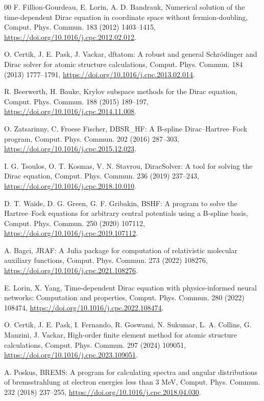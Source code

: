 \documentclass[a4paper,fleqn]{cas-dc}
\begin{document}
\begin{thebibliography}{00}
 F. Fillion-Gourdeau, E. Lorin, A. D. Bandrauk, Numerical solution of the time-dependent Dirac equation in coordinate space without fermion-doubling, Comput. Phys. Commun. 183 (2012) 1403--1415, \url{https://doi.org/10.1016/j.cpc.2012.02.012}.

 O. Certik, J. E. Pask, J. Vackar, dftatom: A robust and general Schr\"odinger and Dirac solver for atomic structure calculations, Comput. Phys. Commun. 184 (2013) 1777--1791, \url{https://doi.org/10.1016/j.cpc.2013.02.014}.

 R. Beerwerth, H. Bauke, Krylov subspace methods for the Dirac equation, Comput. Phys. Commun. 188 (2015) 189--197, \url{https://doi.org/10.1016/j.cpc.2014.11.008}.

 O. Zatsarinny, C. Froese Fischer, DBSR\_HF: A B-spline Dirac--Hartree--Fock program, Comput. Phys. Commun. 202 (2016) 287--303, \url{https://doi.org/10.1016/j.cpc.2015.12.023}.

 I. G. Tsoulos, O. T. Kosmas, V. N. Stavrou, DiracSolver: A tool for solving the Dirac equation, Comput. Phys. Commun. 236 (2019) 237--243, \url{https://doi.org/10.1016/j.cpc.2018.10.010}.

 D. T. Waide, D. G. Green, G. F. Gribakin, BSHF: A program to solve the Hartree--Fock equations for arbitrary central potentials using a B-spline basis, Comput. Phys. Commun. 250 (2020) 107112, \url{https://doi.org/10.1016/j.cpc.2019.107112}.

 A. Bagci, JRAF: A Julia package for computation of relativistic molecular auxiliary functions, Comput. Phys. Commun. 273 (2022) 108276, \url{https://doi.org/10.1016/j.cpc.2021.108276}.

 E. Lorin, X. Yang, Time-dependent Dirac equation with physics-informed neural networks: Computation and properties, Comput. Phys. Commun. 280 (2022) 108474, \url{https://doi.org/10.1016/j.cpc.2022.108474}.

 O. Certik, J. E. Pask, I. Fernando, R. Goswami, N. Sukumar, L. A. Collins, G. Manzini, J. Vackar, High-order finite element method for atomic structure calculations, Comput. Phys. Commun. 297 (2024) 109051, \url{https://doi.org/10.1016/j.cpc.2023.109051}.

 A. Poskus, BREMS: A program for calculating spectra and angular distributions of bremsstrahlung at electron energies less than 3 MeV, Comput. Phys. Commun. 232 (2018) 237--255, \url{https://doi.org/10.1016/j.cpc.2018.04.030}.


\end{thebibliography}
\end{document}
